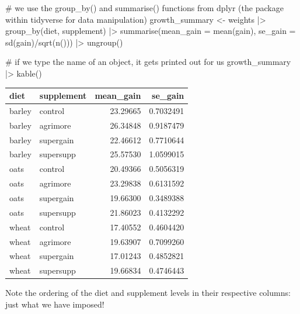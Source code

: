 \documentclass[
  letterpaper,
  DIV=11,
  numbers=noendperiod]{scrreprt}
\newenvironment{Shaded}{\begin{snugshade}}{\end{snugshade}}
\newcommand{\AttributeTok}[1]{\textcolor[rgb]{0.40,0.45,0.13}{#1}}
\newcommand{\CommentTok}[1]{\textcolor[rgb]{0.37,0.37,0.37}{#1}}
\newcommand{\FunctionTok}[1]{\textcolor[rgb]{0.28,0.35,0.67}{#1}}
\newcommand{\NormalTok}[1]{\textcolor[rgb]{0.00,0.23,0.31}{#1}}
\newcommand{\OtherTok}[1]{\textcolor[rgb]{0.00,0.23,0.31}{#1}}
\newcommand{\SpecialCharTok}[1]{\textcolor[rgb]{0.37,0.37,0.37}{#1}}
\begin{document}
\begin{Shaded}
\begin{Highlighting}[]
\CommentTok{\# we use the group\_by() and summarise() functions from dplyr (the package within tidyverse for data manipulation)}
\NormalTok{growth\_summary }\OtherTok{\textless{}{-}}\NormalTok{ weights }\SpecialCharTok{|\textgreater{}}
  \FunctionTok{group\_by}\NormalTok{(diet, supplement) }\SpecialCharTok{|\textgreater{}}
  \FunctionTok{summarise}\NormalTok{(}\AttributeTok{mean\_gain =} \FunctionTok{mean}\NormalTok{(gain), }\AttributeTok{se\_gain =} \FunctionTok{sd}\NormalTok{(gain)}\SpecialCharTok{/}\FunctionTok{sqrt}\NormalTok{(}\FunctionTok{n}\NormalTok{())) }\SpecialCharTok{|\textgreater{}}
  \FunctionTok{ungroup}\NormalTok{()}

\CommentTok{\# if we type the name of an object, it gets printed out for us}
\NormalTok{growth\_summary }\SpecialCharTok{|\textgreater{}} \FunctionTok{kable}\NormalTok{()}
\end{Highlighting}
\end{Shaded}

\begin{table}
\centering
\begin{tabular}[t]{l|l|r|r}
\hline
diet & supplement & mean\_gain & se\_gain\\
\hline
barley & control & 23.29665 & 0.7032491\\
\hline
barley & agrimore & 26.34848 & 0.9187479\\
\hline
barley & supergain & 22.46612 & 0.7710644\\
\hline
barley & supersupp & 25.57530 & 1.0599015\\
\hline
oats & control & 20.49366 & 0.5056319\\
\hline
oats & agrimore & 23.29838 & 0.6131592\\
\hline
oats & supergain & 19.66300 & 0.3489388\\
\hline
oats & supersupp & 21.86023 & 0.4132292\\
\hline
wheat & control & 17.40552 & 0.4604420\\
\hline
wheat & agrimore & 19.63907 & 0.7099260\\
\hline
wheat & supergain & 17.01243 & 0.4852821\\
\hline
wheat & supersupp & 19.66834 & 0.4746443\\
\hline
\end{tabular}
\end{table}

Note the ordering of the diet and supplement levels in their respective
columns: just what we have imposed!
\end{document}
